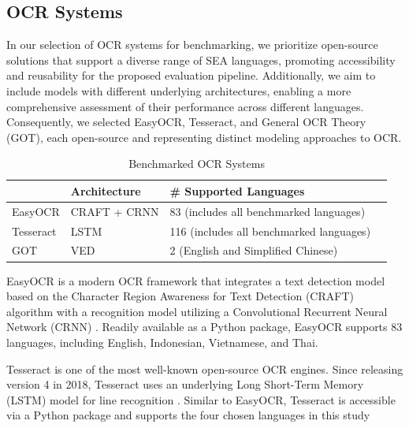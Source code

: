\documentclass[12pt,oneside]{memoir}
\begin{document}
\subsection{OCR Systems}

In our selection of OCR systems for benchmarking, we prioritize open-source solutions that support a diverse range of SEA languages, promoting accessibility and reusability for the proposed evaluation pipeline. 
Additionally, we aim to include models with different underlying architectures, enabling a more comprehensive assessment of their performance across different languages.
Consequently, we selected EasyOCR, Tesseract, and General OCR Theory (GOT), each open-source and representing distinct modeling approaches to OCR.

\begin{table}[ht]
    \centering
    \caption{Benchmarked OCR Systems}
    \label{table:ocr-systems}
    \begin{tabular}{llll}
        \toprule
        & Architecture & \# Supported Languages\\ 
        \midrule
        EasyOCR & CRAFT + CRNN & 83 (includes all benchmarked languages) & \\
        Tesseract & LSTM & 116 (includes all benchmarked languages)\\
        GOT & VED & 2 (English and Simplified Chinese)\\
        \bottomrule
    \end{tabular}
\end{table}

EasyOCR is a modern OCR framework that integrates a text detection model based on the Character Region Awareness for Text Detection (CRAFT) algorithm with a recognition model utilizing a Convolutional Recurrent Neural Network (CRNN) \parencite{easy-ocr-2025}.
Readily available as a Python package, EasyOCR supports 83 languages, including English, Indonesian, Vietnamese, and Thai.

Tesseract is one of the most well-known open-source OCR engines. Since releasing version 4 in 2018, Tesseract uses an underlying Long Short-Term Memory (LSTM) model for line recognition \parencite{tesseract-2025}.
Similar to EasyOCR, Tesseract is accessible via a Python package and supports the four chosen languages in this study 
\end{document}

